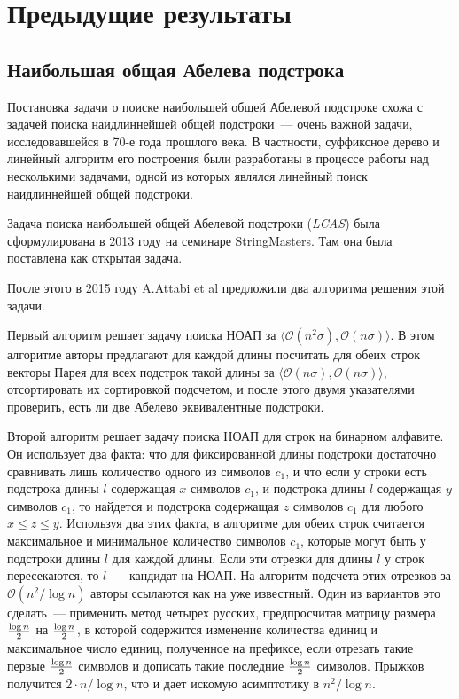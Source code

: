 \section{Предыдущие результаты}
\subsection{Наибольшая общая Абелева подстрока}
Постановка задачи о поиске наибольшей общей Абелевой подстроке схожа с задачей поиска наидлиннейшей общей подстроки~--- очень важной задачи, исследовавшейся в 70-е года прошлого века. В частности, суффиксное дерево и линейный алгоритм его построения были разработаны в процессе работы над несколькими задачами, одной из которых являлся линейный поиск наидлиннейшей общей подстроки.

Задача поиска наибольшей общей Абелевой подстроки (\textit{LCAS}) была сформулирована в 2013 году на семинаре StringMasters. Там она была поставлена как открытая задача. 

После этого в 2015 году A.Attabi et al \cite{1} предложили два алгоритма решения этой задачи. 

Первый алгоритм решает задачу поиска НОАП за $\langle \mathcal{O}(n^2 \sigma), \mathcal{O}(n \sigma) \rangle$. В этом алгоритме авторы предлагают для каждой длины посчитать для обеих строк векторы Парея для всех подстрок такой длины за $\langle \mathcal{O}(n \sigma), \mathcal{O}(n \sigma) \rangle$, отсортировать их сортировкой подсчетом, и после этого двумя указателями проверить, есть ли две Абелево эквивалентные подстроки.

Второй алгоритм решает задачу поиска НОАП для строк на бинарном алфавите. Он использует два факта: что для фиксированной длины подстроки достаточно сравнивать лишь количество одного из символов $c_1$, и что если у строки есть подстрока длины $l$ содержащая $x$ символов $c_1$, и подстрока длины $l$ содержащая $y$ символов $c_1$, то найдется и подстрока содержащая $z$ символов $c_1$ для любого $x \le z \le y$. Используя два этих факта, в алгоритме для обеих строк считается максимальное и минимальное количество символов $c_1$, которые могут быть у подстроки длины $l$ для каждой длины. Если эти отрезки для длины $l$ у строк пересекаются, то $l$~--- кандидат на НОАП. На алгоритм подсчета этих отрезков за $\mathcal{O}(n^2 / \log n)$ авторы ссылаются как на уже известный. Один из вариантов это сделать~--- применить метод четырех русских, предпросчитав матрицу размера $\log n \over 2$ на $\log n \over 2$, в которой содержится изменение количества единиц и максимальное число единиц, полученное на префиксе, если отрезать такие первые $\log n \over 2$ символов и дописать такие последние $\log n \over 2$ символов. Прыжков получится $2 \cdot n / \log n$, что и дает искомую асимптотику в $n^2 / \log n$.

